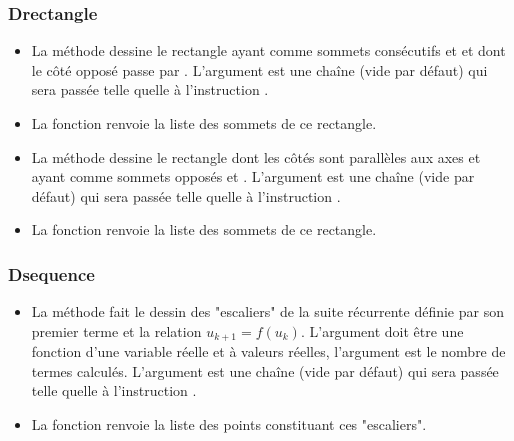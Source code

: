 \subsubsection{Drectangle}
\begin{itemize}
    \item La méthode  dessine le rectangle ayant comme sommets consécutifs  et  et dont le côté opposé passe par . L'argument  est une chaîne (vide par défaut) qui sera passée telle quelle à l'instruction \drawcmd. 
    
    \item La fonction  renvoie la liste des sommets de ce rectangle.
    
    \item La méthode  dessine le rectangle dont les côtés sont parallèles aux axes et ayant comme sommets opposés  et . L'argument  est une chaîne (vide par défaut) qui sera passée telle quelle à l'instruction \drawcmd.
    
    \item La fonction  renvoie la liste des sommets de ce rectangle.
\end{itemize}

\subsubsection{Dsequence}
\begin{itemize}
    \item La méthode  fait le dessin des "escaliers" de la suite récurrente définie par son premier terme  et la relation \(u_{k+1}=f(u_k)\). L'argument  doit être une fonction d'une variable réelle et à valeurs réelles, l'argument  est le nombre de termes calculés. L'argument  est une chaîne (vide par défaut) qui sera passée telle quelle à l'instruction \drawcmd.
    \item La fonction  renvoie la liste des points constituant ces "escaliers".
\end{itemize}

